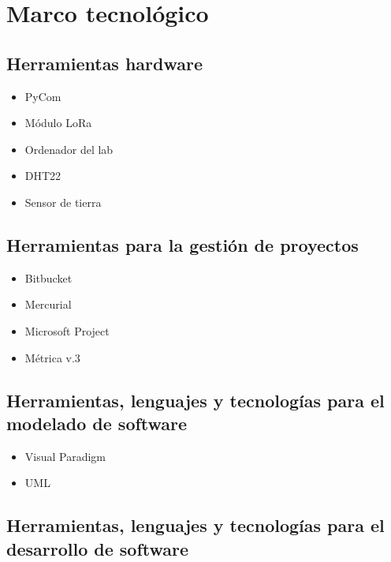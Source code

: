 \section{Marco tecnológico}
\label{sec:metodologia.herramientas}

\subsection{Herramientas hardware}
\label{subsec:metodologia.herramientas.hardware}

\begin{itemize}
    \item PyCom
    \item Módulo LoRa
    \item Ordenador del lab
    \item DHT22
    \item Sensor de tierra
\end{itemize}

\subsection{Herramientas para la gestión de proyectos}
\label{subsec:metodologia.herramientas.proyectos}

\begin{itemize}
    \item Bitbucket
    \item Mercurial
    \item Microsoft Project
    \item Métrica v.3
\end{itemize}

\subsection{Herramientas, lenguajes y tecnologías para el modelado de software}
\label{subsec:metodologia.herramientas.software.modelado}

\begin{itemize}
    \item Visual Paradigm
    \item UML
\end{itemize}

\subsection{Herramientas, lenguajes y tecnologías para el desarrollo de software}
\label{subsec:metodologia.herramientas.software.desarrollo}

